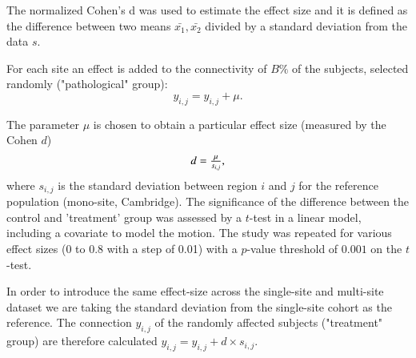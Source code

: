 \documentclass[authoryear]{elsarticle}
\begin{document}
The normalized Cohen's d was used to estimate the effect size and it is defined as the difference between two means $\bar{x_{1}},\bar{x_{2}}$ divided by a standard deviation from the data $s$.

For each site an effect is added to the connectivity of $B\%$ of the subjects, selected randomly ("pathological" group):
\begin{equation}
	y_{i,j} = y_{i,j} + \mu.
\end{equation}

The parameter $\mu$ is chosen to obtain a particular effect size (measured by the Cohen $d$)
\begin{equation}\label{cohen's d}
    \begin{array}{l l}
      d = \frac{\mu}{s_{i,j}},      
    \end{array}
\end{equation}
where $s_{i,j}$ is the standard deviation between region $i$ and $j$ for the reference population (mono-site, Cambridge). The significance of the difference between the control and 'treatment' group was assessed by a $t$-test in a linear model, including a covariate to model the motion. The study was repeated for various effect sizes (0 to 0.8 with a step of 0.01) with a $p$-value threshold of $0.001$ on the $t$-test.

In order to introduce the same effect-size across the single-site and multi-site dataset we are taking the standard deviation from the single-site cohort as the reference.  The connection $y_{i,j}$ of the randomly affected subjects ("treatment" group) are therefore calculated $y_{i,j} = y_{i,j} + d\times s_{i,j}$. 
\end{document}
